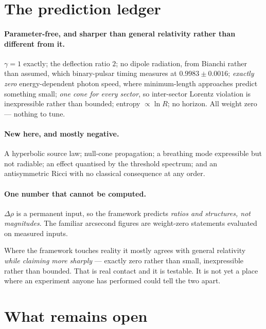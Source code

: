 \documentclass[11pt,a4paper]{article}
\theoremstyle{definition}
\theoremstyle{remark}
\begin{document}
\section{The prediction ledger}
\label{sec:ledger}

\paragraph{Parameter-free, and sharper than general relativity rather than
different from it.} $\gamma=1$ exactly; the deflection ratio $2$; no dipole
radiation, from Bianchi rather than assumed, which binary-pulsar timing measures at
$0.9983\pm0.0016$; \emph{exactly zero} energy-dependent photon speed, where
minimum-length approaches predict something small; \emph{one cone for every
sector}, so inter-sector Lorentz violation is inexpressible rather than bounded;
entropy $\propto\ln R$; no horizon. All weight zero --- nothing to tune.

\paragraph{New here, and mostly negative.} A hyperbolic source law; null-cone
propagation; a breathing mode expressible but not radiable; an effect quantised by
the threshold spectrum; and an antisymmetric Ricci with no classical consequence at
any order.

\paragraph{One number that cannot be computed.} $\Delta\rho$ is a permanent input,
so the framework predicts \emph{ratios and structures, not magnitudes}. The
familiar arcsecond figures are weight-zero statements evaluated on measured inputs.

\begin{claimbox}
Where the framework touches reality it mostly agrees with general relativity
\emph{while claiming more sharply} --- exactly zero rather than small,
inexpressible rather than bounded. That is real contact and it is testable. It is
not yet a place where an experiment anyone has performed could tell the two apart.
\end{claimbox}

\section{What remains open}
\label{sec:open}
\end{document}
